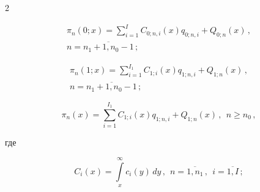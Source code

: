 \begin{multicols}{2}
\noindent


\begin{multline}


\label{ipi-2-m}


\pi_n(0;x) = \sum\limits_{i=1}^{I} C_{0;n,i}(x) q_{0;n,i} +


Q_{0;n}(x) \,, \\[1pt]


 n=\overline{n_1+1,n_0-1}\,;


\end{multline}







\vspace*{-12pt}





\noindent


\begin{multline}


\label{ipi-3-m}


\pi_n(1;x) = \sum\limits_{i=1}^{I_1} C_{1;i}(x) q_{1;n,i} +


Q_{1;n}(x)\,, \\[1pt] 


n=\overline{n_1+1,n_0-1}\,;


\end{multline}




\begin{equation}


\label{ipi-4-m}


\pi_n(x)= \sum\limits_{i=1}^{I_1} C_{1;i}(x) q_{1;n,i} +


Q_{1;n}(x)\,, \ \ n\ge n_0\,,


\end{equation}




где




$$


C_{i}(x)= \int\limits_x^\infty c_{i}(y)\, dy\,, \ \ n=\overline{1,n_1}\,,\ \ i=\overline{1,I}\,;


$$





\vspace*{-12pt}






\end{multicols}
